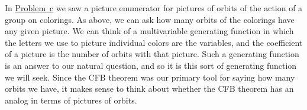 \documentclass[10pt,]{book}
\theoremstyle{plain}
\theoremstyle{definition}
\theoremstyle{definition}
\numberwithin{equation}{chapter}
\begin{document}
In \hyperref[picture-enumerator-hexagon]{Problem~c} we saw a picture enumerator for pictures of orbits of the action of a group on colorings. As above, we can ask how many orbits of the colorings have any given picture. We can think of a multivariable generating function in which the letters we use to picture individual colors are the variables, and the coefficient of a picture is the number of orbits with that picture. Such a generating function is an answer to our natural question, and so it is this sort of generating function we will seek. Since the CFB theorem was our primary tool for saying how many orbits we have, it makes sense to think about whether the CFB theorem has an analog in terms of pictures of orbits.%
\typeout{************************************************}
\typeout{************************************************}
\end{document}
